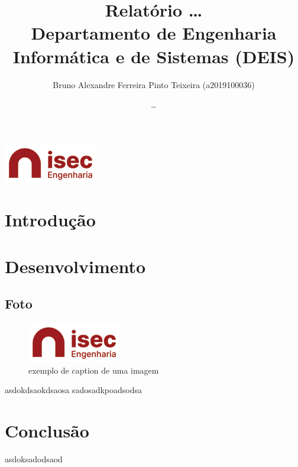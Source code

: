 \documentclass[letterpaper, 11pt]{article}
\author{Bruno Alexandre Ferreira Pinto Teixeira (a2019100036)}
\date{\ldots{}}
\title{Relatório \ldots{}\\\medskip
\large Departamento de Engenharia Informática e de Sistemas (DEIS)}
\begin{document}
\maketitle
\begin{center}
\includegraphics[width=5 cm]{images/isec.png}
\end{center}

\clearpage
\tableofcontents
\clearpage

\listoffigures
\clearpage

\section{Introdução}
\label{sec:orgc87ba34}
\section{Desenvolvimento}
\label{sec:orgecf26f0}
\subsection{Foto}
\label{sec:orgd1ec551}
\begin{figure}[htbp]
\centering
\includegraphics[width=.9\linewidth]{images/isec.png}
\caption{\label{fig:orge53ddd4}
exemplo de caption de uma imagem}
\end{figure}

asdokdsaokdsaosa
sadosadkpoadsodsa

\section{Conclusão}
\label{sec:org2f89c0d}
asdoksadodsaod
\end{document}
